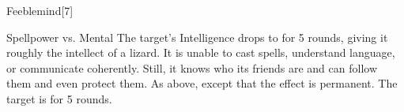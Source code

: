 \begin{spellsection}{Feeblemind}[7]
    \begin{spellheader}
    \end{spellheader}
    \begin{spellcontent}
        \begin{spelltargetinginfo}
        \end{spelltargetinginfo}
        \begin{spelleffects}
            \begin{spellattack}{Spellpower vs. Mental}
                \spellsuccess The target's Intelligence drops to  for 5 rounds, giving it roughly the intellect of a lizard. It is unable to cast spells, understand language, or communicate coherently. Still, it knows who its friends are and can follow them and even protect them.
                \spellcritical As above, except that the effect is permanent.
                \spellfailure The target is \dazed for 5 rounds.
            \end{spellattack}
        \end{spelleffects}
    \end{spellcontent}
    \begin{spellfooter}
        \miscastrandom
    \end{spellfooter}
\end{spellsection}

